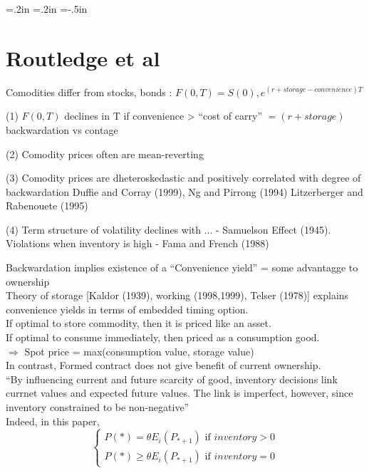 \oddsidemargin=.2in
\evensidemargin=.2in
\textwidth=6in
\topmargin=-.5in
\textheight=9in
\parindent=0in
\pagestyle{empty}


\section*{Routledge et al}
Comodities differ from stocks, bonds : $F(0, T) = S(0), e^{\left( r+ storage - convenience \right)T}$
\begin{list}{ }{}
\item (1) $F(0,T)$ declines in T if convenience > ``cost of carry'' $= (r+storage)$ backwardation vs contage
\item (2) Comodity prices often are mean-reverting
\item (3) Comodity prices are dheteroskedastic and positively correlated with degree of backwardation Duffie and Corray (1999), Ng and Pirrong (1994) Litzerberger and Rabenouete (1995)
\item (4) Term structure of volatility declines with ... - Samuelson Effect (1945). Violations when inventory is high - Fama and French (1988)
\end{list}
Backwardation implies existence of a ``Convenience yield'' = some advantagge to ownership\\

Theory of storage [Kaldor (1939), working (1998,1999), Telser (1978)] explains convenience yields in terms of embedded timing option.\\

If optimal to store commodity, then it is priced like an asset.\\

If optimal to consume immediately, then priced as a consumption good.\\

$\Rightarrow$  Spot price = max(consumption value, storage value)\\

In contrast, Formed contract does not give benefit of current ownership.\\

``By influencing current and future scarcity of good, inventory decisions link currnet values and expected future values. The link is imperfect, however, since inventory constrained to be non-negative''\\

Indeed, in this paper, 
\[ \left\{ \begin{array}{ll}
P(*) = \theta E_i (P_{*+1}) \mbox{  if $inventory > 0$} \\
P(*) \geq \theta E_i (P_{*+1}) \mbox{  if $inventory = 0$} \end{array} \right. \]

